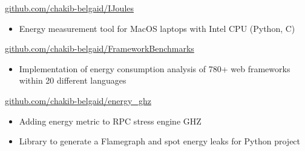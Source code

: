 \documentclass[10pt,a4paper,ragged2e,withhyper]{altacv}
\begin{document}
\begin{paracol}{2}
  \divider
   {\href{https://github.com/chakib-belgaid/IJoules}{github.com/chakib-belgaid/IJoules}}{}{}
  \begin{itemize}
    \item  Energy measurement tool for MacOS laptops with Intel CPU (Python, C)
  \end{itemize}

  \divider
   {\href{https://github.com/chakib-belgaid/FrameworkBenchmarks}{github.com/chakib-belgaid/FrameworkBenchmarks}}{}{}
  \begin{itemize}
    \item  Implementation of energy consumption analysis of 780+ web frameworks within 20 different languages
  \end{itemize}

  \divider
   {\href{https://github.com/chakib-belgaid/energy_ghz}{github.com/chakib-belgaid/energy\_ghz}}{}{}
  \begin{itemize}
    \item  Adding energy metric to RPC stress engine GHZ \end{itemize}
  \divider
  \begin{itemize}
    \item  Library to generate a Flamegraph and spot energy leaks for Python project
  \end{itemize}

  \medskip


  \medskip

  \divider


  \divider





  \medskip


\end{paracol}
\end{document}
